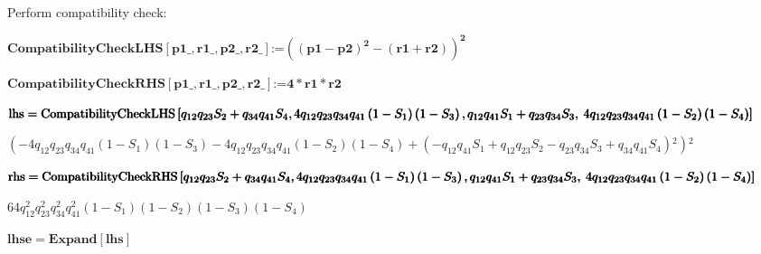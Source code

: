 \documentclass{article}
\begin{document}
Perform compatibility check:

\begin{doublespace}
\noindent\(\pmb{\text{CompatibilityCheckLHS} [\text{p1$\_$},\text{r1$\_$},\text{p2$\_$},\text{r2$\_$}]\text{:=}\left((\text{p1}-\text{p2})^2-(\text{r1}+\text{r2})\right)^2}\)
\end{doublespace}

\begin{doublespace}
\noindent\(\pmb{\text{CompatibilityCheckRHS} [\text{p1$\_$},\text{r1$\_$},\text{p2$\_$},\text{r2$\_$}]\text{:=} 4*\text{r1}*\text{r2}}\)
\end{doublespace}

\begin{doublespace}
\noindent\(\pmb{\text{lhs} = \text{CompatibilityCheckLHS}\left[q_{12}q_{23}S_2+q_{34}q_{41}S_4,4q_{12}q_{23}q_{34}q_{41}\left(1-S_1\right)\left(1-S_3\right),q_{12}q_{41}S_1+q_{23}q_{34}S_3,\right.}\\
\pmb{\left.4q_{12}q_{23}q_{34}q_{41}\left(1-S_2\right)\left(1-S_4\right)\right]}\)
\end{doublespace}

\begin{doublespace}
\noindent\(\left(-4 q_{12} q_{23} q_{34} q_{41} \left(1-S_1\right) \left(1-S_3\right)-4 q_{12} q_{23} q_{34} q_{41} \left(1-S_2\right) \left(1-S_4\right)+\left(-q_{12}
q_{41} S_1+q_{12} q_{23} S_2-q_{23} q_{34} S_3+q_{34} q_{41} S_4\right){}^2\right){}^2\)
\end{doublespace}

\begin{doublespace}
\noindent\(\pmb{\text{rhs} = \text{CompatibilityCheckRHS}\left[q_{12}q_{23}S_2+q_{34}q_{41}S_4,4q_{12}q_{23}q_{34}q_{41}\left(1-S_1\right)\left(1-S_3\right),q_{12}q_{41}S_1+q_{23}q_{34}S_3,\right.}\\
\pmb{\left.4q_{12}q_{23}q_{34}q_{41}\left(1-S_2\right)\left(1-S_4\right)\right]}\)
\end{doublespace}

\begin{doublespace}
\noindent\(64 q_{12}^2 q_{23}^2 q_{34}^2 q_{41}^2 \left(1-S_1\right) \left(1-S_2\right) \left(1-S_3\right) \left(1-S_4\right)\)
\end{doublespace}

\begin{doublespace}
\noindent\(\pmb{\text{lhse} = \text{Expand}[\text{lhs}]}\)
\end{doublespace}
\end{document}
